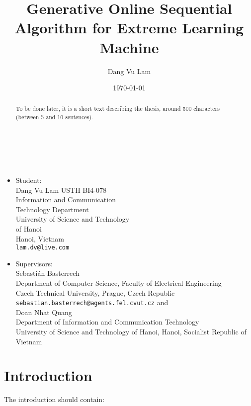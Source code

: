 \documentclass[11pt]{article}
\title{Generative Online Sequential Algorithm for Extreme Learning Machine}
\author{Dang Vu Lam
}
\date{\today}
\begin{document}
\maketitle
~\\
~\\

\begin{minipage}[t]{0.5\textwidth}
\begin{itemize}
\item Student:\\ 
Dang Vu Lam	USTH BI4-078\\
Information and Communication \\Technology Department\\
University of Science and Technology \\of Hanoi\\
Hanoi, Vietnam\\
\texttt{lam.dv@live.com}
\end{itemize}
\end{minipage}
\begin{minipage}[t]{0.5\textwidth}
\begin{itemize}
\item Supervisors:\\
Sebasti\'an Basterrech\\
Department of Computer Science, Faculty of Electrical Engineering\\
Czech Technical University, Prague, Czech Republic\\
\texttt{sebastian.basterrech@agents.fel.cvut.cz}
and \\
Doan Nhat Quang\\
Department of Information and Communication Technology\\
University of Science and Technology of Hanoi, Hanoi, Socialist Republic of Vietnam\\
\texttt{}
\end{itemize}
\end{minipage}

\clearpage
\newpage

\begin{abstract}

To be done later, it is a short text describing the thesis, around 500 characters (between 5 and 10 sentences).

%
\end{abstract}
\newpage
\tableofcontents
\newpage
\section{Introduction}
The introduction should contain:
\end{document}
